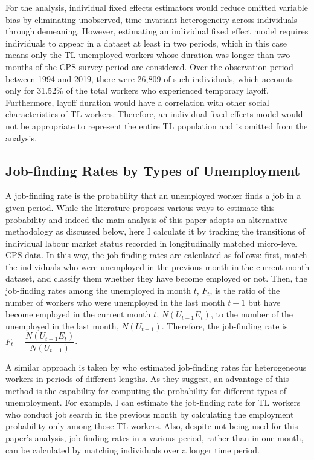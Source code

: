 \documentclass[a4paper, 11pt, tikz]{article}
\newenvironment{ltable}
  {\begin{landscape}}
  {\end{landscape}}
\begin{document}
For the analysis, individual fixed effects estimators would reduce omitted variable bias by eliminating unobserved, time-invariant heterogeneity across individuals through demeaning.
However, estimating an individual fixed effect model requires individuals to appear in a dataset at least in two periods, which in this case means only the TL unemployed workers whose duration was longer than two months of the CPS survey period are considered.
Over the observation period between 1994 and 2019, there were 26,809 of such individuals, which accounts only for 31.52\% of the total workers who experienced temporary layoff.
Furthermore, layoff duration would have a correlation with other social characteristics of TL workers.
Therefore, an individual fixed effects model would not be appropriate to represent the entire TL population and is omitted from the analysis.

\begin{ltable}
  
\end{ltable}

\subsection{Job-finding Rates by Types of Unemployment}
A job-finding rate is the probability that an unemployed worker finds a job in a given period.
While the literature proposes various ways to estimate this probability and indeed the main analysis of this paper adopts an alternative methodology as discussed below, here I calculate it by tracking the transitions of individual labour market status recorded in longitudinally matched micro-level CPS data.
In this way, the job-finding rates are calculated as follows: first, match the individuals who were unemployed in the previous month in the current month dataset, and classify them whether they have become employed or not.
Then, the job-finding rates among the unemployed in month $t$, $F_t$, is the ratio of the number of workers who were unemployed in the last month $t - 1$ but have become employed in the current month $t$, $N(U_{t-1}E_t)$, to the number of the unemployed in the last month, $N(U_{t-1})$.
Therefore, the job-finding rate is $F_t = \dfrac{N(U_{t-1}E_t)}{N(U_{t-1})}$.

A similar approach is taken by \cite{hall2018measuring} who estimated job-finding rates for heterogeneous workers in periods of different lengths.
As they suggest, an advantage of this method is the capability for computing the probability for different types of unemployment.
For example, I can estimate the job-finding rate for TL workers who conduct job search in the previous month by calculating the employment probability only among those TL workers.
Also, despite not being used for this paper's analysis, job-finding rates in a various period, rather than in one month, can be calculated by matching individuals over a longer time period.
\end{document}
